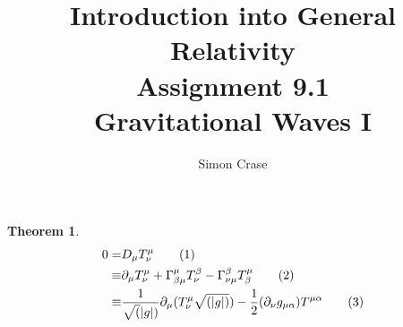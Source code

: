 \documentclass[]{article}
\title{Introduction into General Relativity\\Assignment 9.1\\Gravitational Waves I}
\author{Simon Crase}
\newtheorem{theorem}{Theorem}
\newcommand\numberthis{\addtocounter{equation}{1}\tag{\theequation}}
\begin{document}
\maketitle
\thispagestyle{fancy}
\raggedright

\begin{theorem}
	\begin{align*}
	0 =& D_{\mu} T^{\mu}_{\nu} \numberthis\label{eq:continuity} \\
	\equiv & \partial_{\mu} T^{\mu}_{\nu} + \Gamma^{\mu}_{\beta\mu}T^{\beta}_{\nu}-\Gamma^{\beta}_{\nu\mu}T^{\mu}_{\beta} \numberthis\label{eq:covariant-derivative}\\
	\equiv& \frac{1}{\sqrt(|g|)}\partial_{\mu}(T^{\mu}_{\nu}\sqrt{(|g|)}) - \frac{1}{2}(\partial_{\nu}g_{\mu\alpha})T^{\mu\alpha} \numberthis\label{eq:final}
	\end{align*}
\end{theorem}
\end{document}

